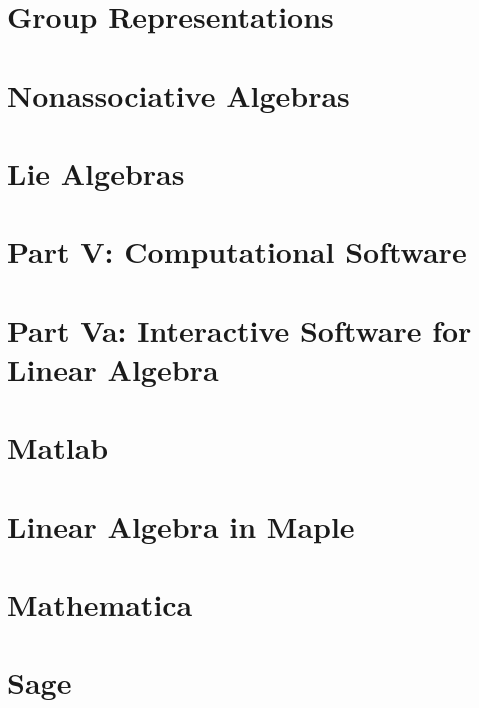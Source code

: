 \documentclass[a4paper]{article}
\begin{document}
\section{Group Representations}

\section{Nonassociative Algebras}

\section{Lie Algebras}

\section*{Part V: Computational Software}

\section*{Part Va: Interactive Software for Linear Algebra}

\section{Matlab}

\section{Linear Algebra in Maple}

\section{Mathematica}

\section{Sage}
\end{document}
